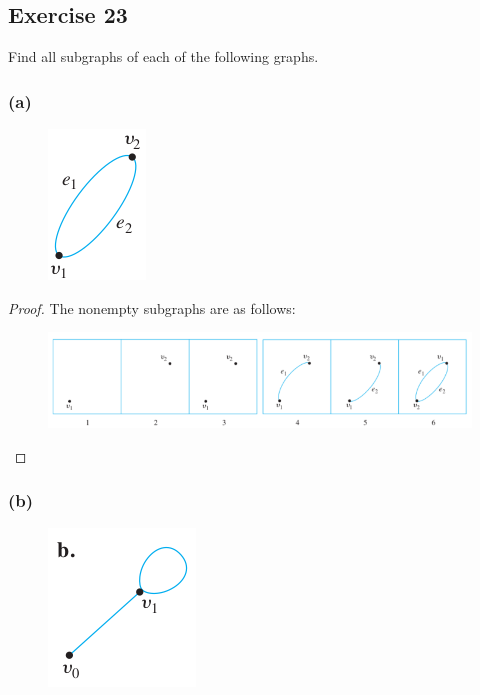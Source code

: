 \documentclass[14pt]{extarticle}
\begin{document}
\subsection{Exercise 23}
Find all subgraphs of each of the following graphs.

\subsubsection{(a)}
\begin{figure}[ht!]
    \centering
    \includegraphics[scale=0.5]{../images/10.1.23.a.1.png}
\end{figure}

\begin{proof}
    The nonempty subgraphs are as follows:

    \begin{figure}[ht!]
        \centering
        \includegraphics[scale=0.6]{../images/10.1.23.a.2.png}
    \end{figure}
\end{proof}

\subsubsection{(b)}
\begin{figure}[ht!]
    \centering
    \includegraphics[scale=0.5]{../images/10.1.23.b.1.png}
\end{figure}
\end{document}
